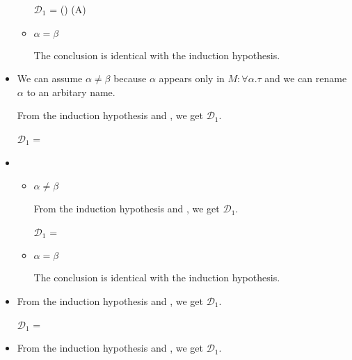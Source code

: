 \begin{itemize}
\begin{itemize}
		            $\mathcal{D}_1$ = 
		            { \andalso \alpha \notin \FTV(\GG) \cup \FTV(A)}

		      \item $\alpha = \beta$

		            The conclusion is identical with the induction hypothesis.

	      \end{itemize}

	\item \QIns

	      We can assume $\alpha \neq \beta$ because $\alpha$ appears only in $M:\forall\alpha.\tau$ and we can rename $\alpha$ to an arbitary name.

	      From the induction hypothesis and \QIns, we get $\mathcal{D}_1$.

	      $\mathcal{D}_1$ = 
	      {}

	\item \QCsp

	      \begin{itemize}

		      \item $\alpha \neq \beta$

		            From the induction hypothesis and \QCsp, we get $\mathcal{D}_1$.

		            $\mathcal{D}_1$ = 
		            {}

		      \item $\alpha = \beta$

		            The conclusion is identical with the induction hypothesis.

	      \end{itemize}

	\item \QRefl

	      From the induction hypothesis and \QRefl, we get $\mathcal{D}_1$.

	      $\mathcal{D}_1$ = 
	      {}

	\item \QSym

	      From the induction hypothesis and \QSym, we get $\mathcal{D}_1$.


\end{itemize}
